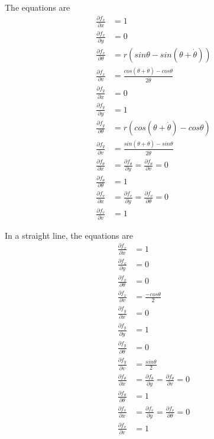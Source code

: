 \documentclass[11pt]{article}
\begin{document}
The equations are
\begin{align}
\frac{\partial f_x}{\partial x} & = 1 \\
\frac{\partial f_x}{\partial y} & = 0 \\
\frac{\partial f_x}{\partial \theta} & = r(sin\theta - sin(\theta + \dot{\theta})) \\
\frac{\partial f_x}{\partial v} & = \frac{cos(\theta + \dot{\theta}) - cos\theta}{2 \dot{\theta}} \\
\frac{\partial f_y}{\partial x} & = 0 \\
\frac{\partial f_y}{\partial y} & = 1 \\
\frac{\partial f_y}{\partial \theta} & = r(cos(\theta + \dot{\theta}) - cos\theta) \\
\frac{\partial f_y}{\partial v} & = \frac{sin(\theta + \dot{\theta}) - sin\theta}{2 \dot{\theta}} \\ 
\frac{\partial f_{\theta}}{\partial x} & = \frac{\partial f_{\theta}}{\partial y} = \frac{\partial f_{\theta}}{\partial v} = 0 \\
\frac{\partial f_{\theta}}{\partial \theta} & = 1 \\
\frac{\partial f_v}{\partial x} & = \frac{\partial f_v}{\partial y} = \frac{\partial f_v}{\partial \theta} = 0 \\
\frac{\partial f_v}{\partial v} & = 1
\end{align}

In a straight line, the equations are
\begin{align}
\frac{\partial f_x}{\partial x} & = 1 \\
\frac{\partial f_x}{\partial y} & = 0 \\
\frac{\partial f_x}{\partial \theta} & = 0 \\
\frac{\partial f_x}{\partial v} & = \frac{-cos\theta}{2} \\
\frac{\partial f_y}{\partial x} & = 0 \\
\frac{\partial f_y}{\partial y} & = 1 \\
\frac{\partial f_y}{\partial \theta} & = 0 \\
\frac{\partial f_y}{\partial v} & = \frac{sin\theta}{2} \\
\frac{\partial f_{\theta}}{\partial x} & = \frac{\partial f_{\theta}}{\partial y} = \frac{\partial f_{\theta}}{\partial v} = 0 \\
\frac{\partial f_{\theta}}{\partial \theta} & = 1 \\
\frac{\partial f_v}{\partial x} & = \frac{\partial f_v}{\partial y} = \frac{\partial f_v}{\partial \theta} = 0 \\
\frac{\partial f_v}{\partial v} & = 1
\end{align}
\newpage
\end{document}
